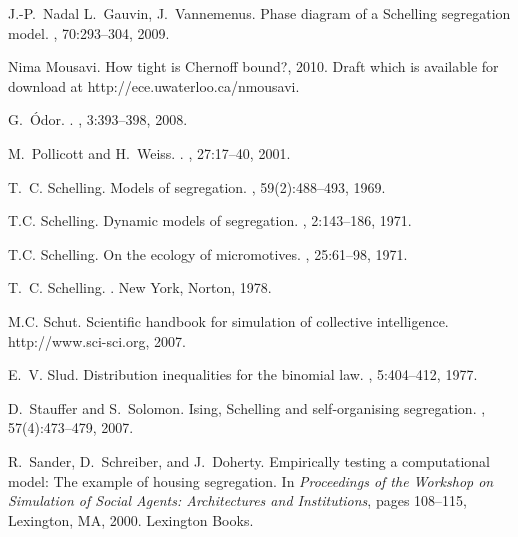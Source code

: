 \documentclass[11pt]{article}
\theoremstyle{plain}
\numberwithin{equation}{subsection}
\begin{document}
\begin{thebibliography}{CMGP13}
J.-P.~Nadal L.~Gauvin, J.~Vannemenus.
\newblock Phase diagram of a {S}chelling segregation model.
, 70:293--304, 2009.

Nima Mousavi.
\newblock How tight is {C}hernoff bound?, 2010.
\newblock Draft which is available for download at
  http://ece.uwaterloo.ca/nmousavi.

G.\ \'{O}dor.
.
, 3:393--398, 2008.

M.\ Pollicott and H.\ Weiss.
.
, 27:17--40, 2001.

T.~C. Schelling.
\newblock Models of segregation.
, 59(2):488--493, 1969.

T.C. Schelling.
\newblock Dynamic models of segregation.
, 2:143--186, 1971.

T.C. Schelling.
\newblock On the ecology of micromotives.
, 25:61--98, 1971.

T.~C. Schelling.
.
\newblock New York, Norton, 1978.

M.C. Schut.
\newblock Scientific handbook for simulation of collective intelligence.
\newblock http://www.sci-sci.org, 2007.

E.~V. Slud.
\newblock Distribution inequalities for the binomial law.
, 5:404--412, 1977.

D.~Stauffer and S.~Solomon.
\newblock Ising, {S}chelling and self-organising segregation.
, 57(4):473--479, 2007.

R.~Sander, D.~Schreiber, and J.~Doherty.
\newblock Empirically testing a computational model: The example of housing
  segregation.
\newblock In {\em Proceedings of the Workshop on Simulation of Social Agents:
  Architectures and Institutions}, pages 108--115, Lexington, MA, 2000.
  Lexington Books.


\end{thebibliography}
\end{document}
